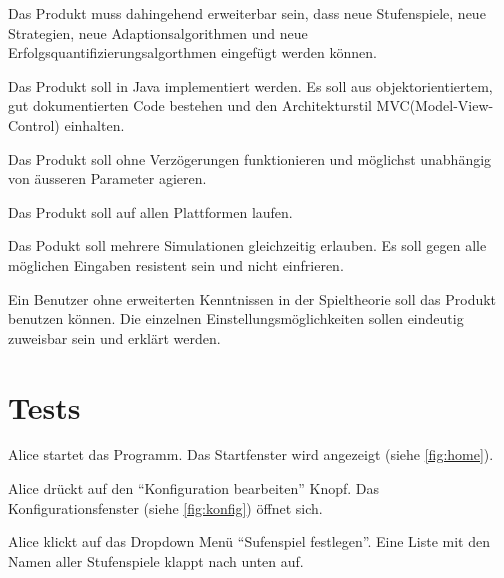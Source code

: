 \documentclass[parskip=full,11pt]{scrartcl}
\begin{document}

Das Produkt muss dahingehend erweiterbar sein,
dass neue Stufenspiele, neue Strategien, neue Adaptionsalgorithmen und neue Erfolgsquantifizierungsalgorthmen eingefügt werden können.


Das Produkt soll in Java implementiert werden. Es soll aus objektorientiertem, gut dokumentierten Code bestehen und den Architekturstil MVC(Model-View-Control) einhalten.


Das Produkt soll ohne Verzögerungen funktionieren und möglichst unabhängig von äusseren Parameter agieren.


Das Produkt soll auf allen Plattformen laufen.


Das Podukt soll mehrere Simulationen gleichzeitig erlauben. Es soll gegen alle möglichen Eingaben resistent sein und nicht einfrieren.


Ein Benutzer ohne erweiterten Kenntnissen in der Spieltheorie soll das Produkt benutzen können.
Die einzelnen Einstellungsmöglichkeiten sollen eindeutig zuweisbar sein und erklärt werden.

\section{Tests}


{Alice startet das Programm.}
{Das Startfenster wird angezeigt (siehe \cref{fig:home}).}

{Alice drückt auf den \enquote{Konfiguration bearbeiten} Knopf.}%
{Das Konfigurationsfenster (siehe \cref{fig:konfig}) öffnet sich.}

{Alice klickt auf das Dropdown Menü \enquote{Sufenspiel festlegen}.}%
{Eine Liste mit den Namen aller Stufenspiele klappt nach unten auf.}
\end{document}
